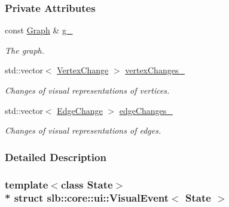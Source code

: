\subsubsection*{Private Attributes}
\begin{DoxyCompactItemize}
\item 
const \hyperlink{structslb_1_1core_1_1ui_1_1StateGraph}{Graph} \& \hyperlink{structslb_1_1core_1_1ui_1_1VisualEvent_ab15c3451a974b7656b214389d4e2f938}{g\+\_\+}\hypertarget{structslb_1_1core_1_1ui_1_1VisualEvent_ab15c3451a974b7656b214389d4e2f938}{}\label{structslb_1_1core_1_1ui_1_1VisualEvent_ab15c3451a974b7656b214389d4e2f938}

\begin{DoxyCompactList}\small\item\em The graph. \end{DoxyCompactList}\item 
std\+::vector$<$ \hyperlink{structslb_1_1core_1_1ui_1_1VisualEvent_1_1VertexChange}{Vertex\+Change} $>$ \hyperlink{structslb_1_1core_1_1ui_1_1VisualEvent_ae487f14182670f17dfc76238e2b2939e}{vertex\+Changes\+\_\+}\hypertarget{structslb_1_1core_1_1ui_1_1VisualEvent_ae487f14182670f17dfc76238e2b2939e}{}\label{structslb_1_1core_1_1ui_1_1VisualEvent_ae487f14182670f17dfc76238e2b2939e}

\begin{DoxyCompactList}\small\item\em Changes of visual representations of vertices. \end{DoxyCompactList}\item 
std\+::vector$<$ \hyperlink{structslb_1_1core_1_1ui_1_1VisualEvent_1_1EdgeChange}{Edge\+Change} $>$ \hyperlink{structslb_1_1core_1_1ui_1_1VisualEvent_a59683e186a0dcdffaa75737b621d0ca4}{edge\+Changes\+\_\+}\hypertarget{structslb_1_1core_1_1ui_1_1VisualEvent_a59683e186a0dcdffaa75737b621d0ca4}{}\label{structslb_1_1core_1_1ui_1_1VisualEvent_a59683e186a0dcdffaa75737b621d0ca4}

\begin{DoxyCompactList}\small\item\em Changes of visual representations of edges. \end{DoxyCompactList}\end{DoxyCompactItemize}


\subsubsection{Detailed Description}
\subsubsection*{template$<$class State$>$\\*
struct slb\+::core\+::ui\+::\+Visual\+Event$<$ State $>$}

